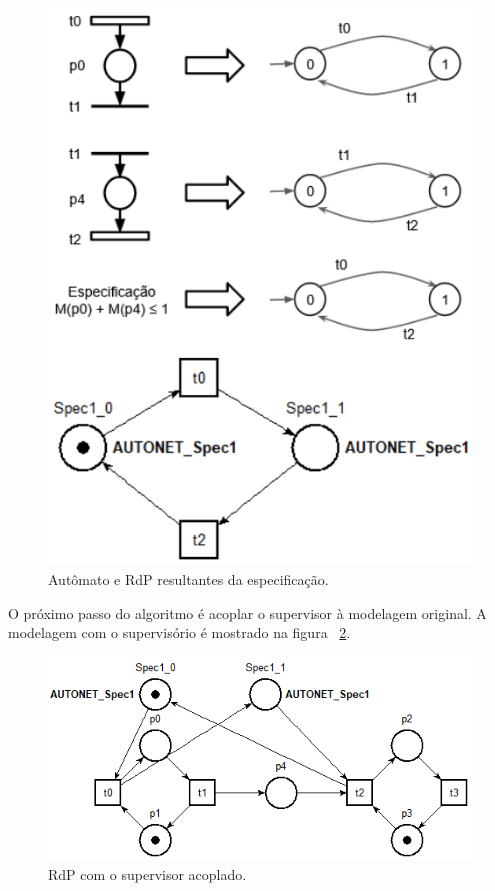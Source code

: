 \begin{figure}[!htb]
	\caption[Autômato e RdP resultantes da especifica\c{c}\~ao.]{Autômato e RdP resultantes da especifica\c{c}\~ao.}
	\label{fig:pqnafabespec}
	\includegraphics[width=16cm]{./figuras/PQNAFABESPEC.png}\centering
\end{figure}

O pr\'oximo passo do algoritmo \'e acoplar o supervisor \`a modelagem original. A modelagem com o supervis\'orio \'e mostrado na figura ~\ref{fig:pqnafabsup}.

\begin{figure}[!htb]
	\caption[RdP com o supervisor acoplado.]{RdP com o supervisor acoplado.}
	\label{fig:pqnafabsup}
	\includegraphics[width=16cm]{./figuras/PQNAFABSUP.png}\centering
\end{figure}


